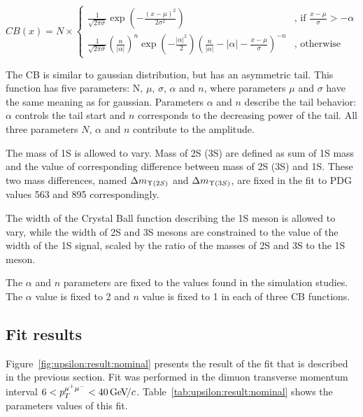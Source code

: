 \begin{equation}
CB(x) = N \times
\begin{cases}
\frac{1}{\sqrt{2\pi\sigma}}\exp(-\frac{{(x-\mu)}^2}{2\sigma^2}) & \text{, if $\frac{x-\mu}{\sigma} > -\alpha$} \\
\frac{1}{\sqrt{2\pi\sigma}}{(\frac{n}{|\alpha|})}^n \exp(-\frac{|\alpha|^2}{2}){(\frac{n}{|\alpha|}-|\alpha|-\frac{x-\mu}{\sigma})}^{-n} & \text{, otherwise}
\end{cases}
\label{eq:cb}
\end{equation}

The CB is similar to gaussian distribution, but has an asymmetric tail. This
function has five parameters: N, $\mu$, $\sigma$, $\alpha$ and $n$, where
parameters $\mu$ and $\sigma$ have the same meaning as for gaussian. Parameters
$\alpha$ and $n$ describe the tail behavior: $\alpha$ controls the tail start
and $n$ corresponds to the decreasing power of the tail. All three parameters
$N$, $\alpha$ and $n$ contribute to the amplitude.

The mass of \Y1S is allowed to vary. Mass of \Y2S (\Y3S) are defined as sum of
\Y1S mass and the value of corresponding difference between mass of
\Y2S (\Y3S) and \Y1S. These two mass differences, named $\Delta m_{\Y2S}$ and
$\Delta m_{\Y3S}$, are fixed in the fit to PDG~\cite{PDG2012} values 563 \mevcc
and 895 \mevcc correspondingly.

The width of the Crystal Ball function describing the \Y1S meson is allowed to
vary, while the width of \Y2S and \Y3S mesons are constrained to the value of
the width of the \Y1S signal, scaled by the ratio of the masses of \Y2S and \Y3S
to the \Y1S meson.

The  $\alpha$ and $n$ parameters are fixed to the values found in
the simulation studies.
The $\alpha$ value is fixed to 2 and $n$ value is fixed to 1 in each of three
CB functions.

\subsection{Fit results}
\label{sec:upsilon:result}

Figure~\ref{fig:upsilon:result:nominal} presents the result of the fit that is
described in the previous section. Fit was performed in the dimuon
transverse momentum interval $ 6 < p_T^{\mu^+\mu^-} < 40 {\mathrm{\,Ge\kern -0.1em V\!/}c}$.
Table~\ref{tab:upsilon:result:nominal} shows the parameters values of this fit.

